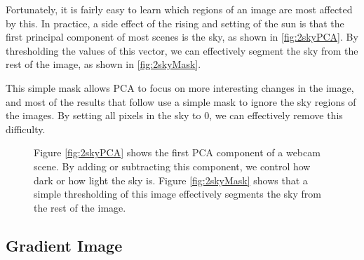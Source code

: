 Fortunately, it is fairly easy to learn which regions of an image are most affected by this.  In practice, a side effect of the rising and setting of the sun is that the first principal component of most scenes is the sky, as shown in \ref{fig:2skyPCA}.  By thresholding the values of this vector, we can effectively segment the sky from the rest of the image, as shown in \ref{fig:2skyMask}.

This simple mask allows PCA to focus on more interesting changes in the image, and most of the results that follow use a simple mask to ignore the sky regions of the images.  By setting all pixels in the sky to 0, we can effectively remove this difficulty.


\begin{figure}[ht]
	\centering
		\caption[Learning a sky mask for a webcam scene.]{Figure \ref{fig:2skyPCA} shows the first PCA component of a webcam scene.  By adding or subtracting this component, we control how dark or how light the sky is. Figure \ref{fig:2skyMask} shows that a simple thresholding of this image effectively segments the sky from the rest of the image.}
		
\end{figure}\subsection{Gradient Image}

